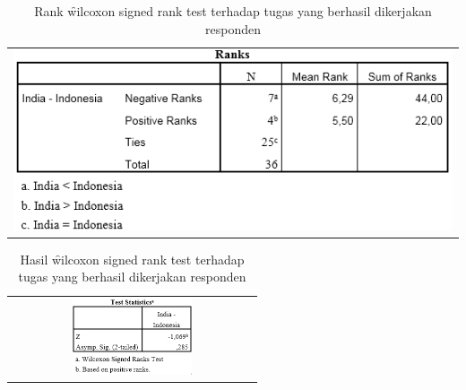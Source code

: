 \begin{table}
	\centering
	\caption{Rank \f{wilcoxon signed rank test} terhadap tugas yang berhasil dikerjakan responden}
	\label{tab:ranktugasgagal}
	\begin{tabular}{c}
		\includegraphics[width=\textwidth]
		{pics/rankGagal.PNG}
	\end{tabular}
\end{table}
\begin{table}
	\centering
	\caption{Hasil \f{wilcoxon signed rank test} terhadap tugas yang berhasil dikerjakan responden}
	\label{tab:hasiltugasgagal}
	\begin{tabular}{c}
		\includegraphics[width=0.5\textwidth]
		{pics/gagalWilcoxon.PNG}
	\end{tabular}
\end{table}
